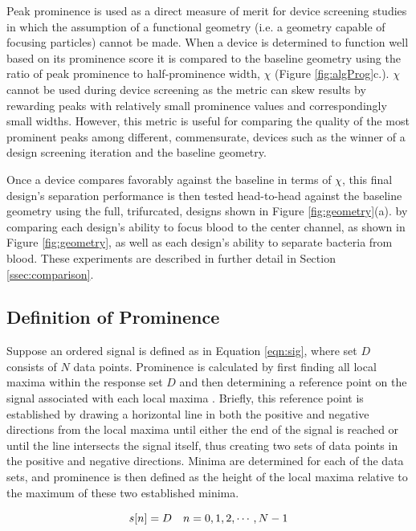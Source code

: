 Peak prominence is used as a direct measure of merit for device screening studies in which the assumption of a functional geometry (i.e. a geometry capable of focusing particles) cannot be made. When a device is determined to function well based on its prominence score it is compared to the baseline geometry using the ratio of peak prominence to half-prominence width, $\chi$ (Figure \ref{fig:algProg}c.). $\chi$ cannot be used during device screening as the metric can skew results by rewarding peaks with relatively small prominence values and correspondingly small widths. However, this metric is useful for comparing the quality of the most prominent peaks among different, commensurate, devices such as the winner of a design screening iteration and the baseline geometry.

Once a device compares favorably against the baseline in terms of $\chi$, this final design's separation performance is then tested head-to-head against the baseline geometry using the full, trifurcated, designs shown in Figure \ref{fig:geometry}(a). by comparing each design's ability to focus blood to the center channel, as shown in Figure \ref{fig:geometry}, as well as each design's ability to separate bacteria from blood. These experiments are described in further detail in Section \ref{ssec:comparison}.

\subsection{Definition of Prominence}
\label{ssec:prom}
Suppose an ordered signal is defined as in Equation \ref{eqn:sig}, where set $D$ consists of $N$ data points. Prominence is calculated by first finding all local maxima within the response set $D$ and then determining a reference point on the signal associated with each local maxima \cite{arge2013algorithms}. Briefly, this reference point is established by drawing a horizontal line in both the positive and negative directions from the local maxima until either the end of the signal is reached or until the line intersects the signal itself, thus creating two sets of data points in the positive and negative directions. Minima are determined for each of the data sets, and prominence is then defined as the height of the local maxima relative to the maximum of these two established minima. 

\begin{equation}
  \label{eqn:sig}
  \hfill s[n]=D \quad n=0,1,2,\cdots,N-1 \hfill
\end{equation}

